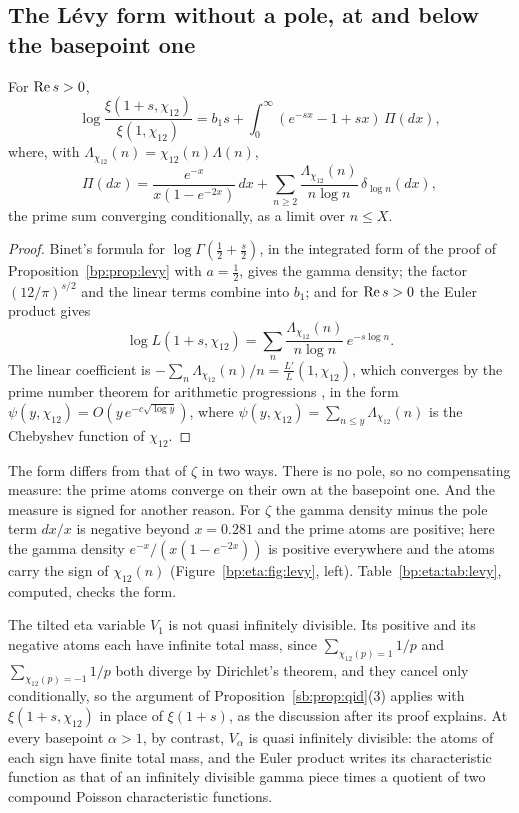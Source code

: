 \subsection{The L\'evy form without a pole, at and below the basepoint one}\label{bp:eta:sec:levy}

\begin{proposition}\label{bp:eta:prop:levy}
For $\operatorname{Re} s>0$,
\[
\log\frac{\xi(1+s,\chi_{12})}{\xi(1,\chi_{12})}=b_1s+\int_0^\infty(e^{-sx}-1+sx)\,\Pi(dx),
\]
where, with $\Lambda_{\chi_{12}}(n)=\chi_{12}(n)\Lambda(n)$,
\[
\Pi(dx)=\frac{e^{-x}}{x(1-e^{-2x})}\,dx+\sum_{n\ge2}\frac{\Lambda_{\chi_{12}}(n)}{n\log n}\,\delta_{\log n}(dx),
\]
the prime sum converging conditionally, as a limit over $n\le X$.
\end{proposition}

\begin{proof}
Binet's formula \cite[\S5.9]{DLMF} for $\log\Gamma(\frac12+\frac s2)$, in the integrated form of the proof of Proposition~\ref{bp:prop:levy} with $a=\frac12$, gives the gamma density; the factor $(12/\pi)^{s/2}$ and the linear terms combine into $b_1$; and for $\operatorname{Re} s>0$ the Euler product gives
\[
\log L(1+s,\chi_{12})=\sum_n\frac{\Lambda_{\chi_{12}}(n)}{n\log n}\,e^{-s\log n}.
\]
The linear coefficient is $-\sum_n\Lambda_{\chi_{12}}(n)/n=\frac{L'}L(1,\chi_{12})$, which converges by the prime number theorem for arithmetic progressions \cite[Chapter~20]{Davenport}, in the form $\psi(y,\chi_{12})=O(y\,e^{-c\sqrt{\log y}})$, where $\psi(y,\chi_{12})=\sum_{n\le y}\Lambda_{\chi_{12}}(n)$ is the Chebyshev function of $\chi_{12}$.
\end{proof}

The form differs from that of $\zeta$ in two ways. There is no pole, so no compensating measure: the prime atoms converge on their own at the basepoint one. And the measure is signed for another reason. For $\zeta$ the gamma density minus the pole term $dx/x$ is negative beyond $x=0.281$ and the prime atoms are positive; here the gamma density $e^{-x}/(x(1-e^{-2x}))$ is positive everywhere and the atoms carry the sign of $\chi_{12}(n)$ (Figure~\ref{bp:eta:fig:levy}, left). Table~\ref{bp:eta:tab:levy}, computed, checks the form.

The tilted eta variable $V_1$ is not quasi infinitely divisible. Its positive and its negative atoms each have infinite total mass, since $\sum_{\chi_{12}(p)=1}1/p$ and $\sum_{\chi_{12}(p)=-1}1/p$ both diverge by Dirichlet's theorem, and they cancel only conditionally, so the argument of Proposition~\ref{sb:prop:qid}(3) applies with $\xi(1+s,\chi_{12})$ in place of $\xi(1+s)$, as the discussion after its proof explains. At every basepoint $\alpha>1$, by contrast, $V_\alpha$ is quasi infinitely divisible: the atoms of each sign have finite total mass, and the Euler product writes its characteristic function as that of an infinitely divisible gamma piece times a quotient of two compound Poisson characteristic functions.

